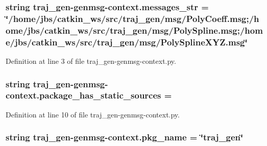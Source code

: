 \subsubsection[{\texorpdfstring{messages\+\_\+str}{messages_str}}]{\setlength{\rightskip}{0pt plus 5cm}string traj\+\_\+gen-\/genmsg-\/context.\+messages\+\_\+str = \char`\"{}/home/jbs/catkin\+\_\+ws/src/traj\+\_\+gen/msg/Poly\+Coeff.\+msg;/home/jbs/catkin\+\_\+ws/src/traj\+\_\+gen/msg/Poly\+Spline.\+msg;/home/jbs/catkin\+\_\+ws/src/traj\+\_\+gen/msg/Poly\+Spline\+X\+Y\+Z.\+msg\char`\"{}}\hypertarget{namespacetraj__gen-genmsg-context_aa35e0362011f87c9efa81944ad02a72c}{}\label{namespacetraj__gen-genmsg-context_aa35e0362011f87c9efa81944ad02a72c}


Definition at line 3 of file traj\+\_\+gen-\/genmsg-\/context.\+py.

\subsubsection[{\texorpdfstring{package\+\_\+has\+\_\+static\+\_\+sources}{package_has_static_sources}}]{\setlength{\rightskip}{0pt plus 5cm}string traj\+\_\+gen-\/genmsg-\/context.\+package\+\_\+has\+\_\+static\+\_\+sources = \textquotesingle{}\textquotesingle{}}\hypertarget{namespacetraj__gen-genmsg-context_af35b61303a0f549aa91143caa757dcae}{}\label{namespacetraj__gen-genmsg-context_af35b61303a0f549aa91143caa757dcae}


Definition at line 10 of file traj\+\_\+gen-\/genmsg-\/context.\+py.

\subsubsection[{\texorpdfstring{pkg\+\_\+name}{pkg_name}}]{\setlength{\rightskip}{0pt plus 5cm}string traj\+\_\+gen-\/genmsg-\/context.\+pkg\+\_\+name = \char`\"{}traj\+\_\+gen\char`\"{}}\hypertarget{namespacetraj__gen-genmsg-context_ab5dc5dad70851fcfb8bd37f81a8f57e1}{}\label{namespacetraj__gen-genmsg-context_ab5dc5dad70851fcfb8bd37f81a8f57e1}


